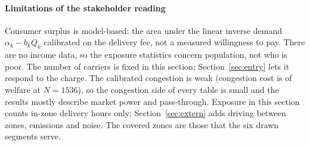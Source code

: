 \paragraph{Limitations of the stakeholder reading} Consumer surplus is model-based: the area under the linear inverse demand $\alpha_k-b_kQ_k$ calibrated on the delivery fee, not a measured willingness to pay. There are no income data, so the exposure statistics concern population, not who is poor. The number of carriers is fixed in this section; Section~\ref{sec:entry} lets it respond to the charge. The calibrated congestion is weak (congestion cost is \pc{\LBigCCshare} of welfare at $N=1536$), so the congestion side of every table is small and the results mostly describe market power and pass-through. Exposure in this section counts in-zone delivery hours only; Section~\ref{sec:extern} adds driving between zones, emissions and noise. The covered zones are those that the six drawn segments serve.
